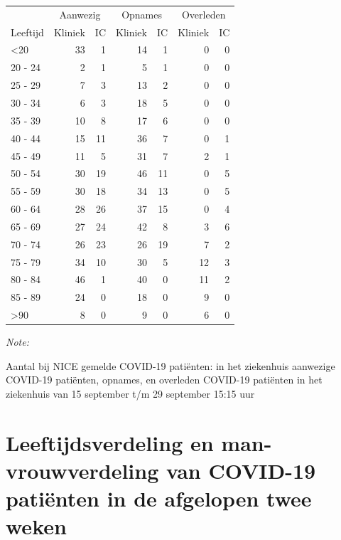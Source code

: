 \documentclass[
  english,
  man,floatsintext]{apa6}
\begin{document}
\begin{table}
\centering\begingroup\fontsize{10}{12}\selectfont

\begin{threeparttable}
\begin{tabular}{lrrrrrr}
\toprule
\multicolumn{1}{c}{ } & \multicolumn{2}{c}{Aanwezig} & \multicolumn{2}{c}{Opnames} & \multicolumn{2}{c}{Overleden} \\
\cmidrule(l{3pt}r{3pt}){2-3} \cmidrule(l{3pt}r{3pt}){4-5} \cmidrule(l{3pt}r{3pt}){6-7}
Leeftijd & Kliniek & IC & Kliniek & IC & Kliniek & IC\\
\midrule
<20 & 33 & 1 & 14 & 1 & 0 & 0\\
20 - 24 & 2 & 1 & 5 & 1 & 0 & 0\\
25 - 29 & 7 & 3 & 13 & 2 & 0 & 0\\
30 - 34 & 6 & 3 & 18 & 5 & 0 & 0\\
35 - 39 & 10 & 8 & 17 & 6 & 0 & 0\\
40 - 44 & 15 & 11 & 36 & 7 & 0 & 1\\
45 - 49 & 11 & 5 & 31 & 7 & 2 & 1\\
50 - 54 & 30 & 19 & 46 & 11 & 0 & 5\\
55 - 59 & 30 & 18 & 34 & 13 & 0 & 5\\
60 - 64 & 28 & 26 & 37 & 15 & 0 & 4\\
65 - 69 & 27 & 24 & 42 & 8 & 3 & 6\\
70 - 74 & 26 & 23 & 26 & 19 & 7 & 2\\
75 - 79 & 34 & 10 & 30 & 5 & 12 & 3\\
80 - 84 & 46 & 1 & 40 & 0 & 11 & 2\\
85 - 89 & 24 & 0 & 18 & 0 & 9 & 0\\
>90 & 8 & 0 & 9 & 0 & 6 & 0\\
\bottomrule
\end{tabular}
\begin{tablenotes}
\item \textit{Note: } 
\item Aantal bij NICE gemelde COVID-19 patiënten: in het ziekenhuis aanwezige COVID-19 patiënten, opnames, en overleden COVID-19 patiënten in het ziekenhuis van 15 september t/m 29 september 15:15 uur
\end{tablenotes}
\end{threeparttable}
\endgroup{}
\end{table}

\newpage

\hypertarget{leeftijdsverdeling-en-man-vrouwverdeling-van-covid-19-patiuxebnten-in-de-afgelopen-twee-weken}{%
\section{Leeftijdsverdeling en man-vrouwverdeling van COVID-19 patiënten in de afgelopen twee weken}\label{leeftijdsverdeling-en-man-vrouwverdeling-van-covid-19-patiuxebnten-in-de-afgelopen-twee-weken}}
\end{document}
